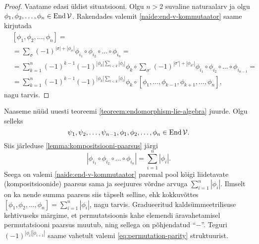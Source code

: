 \begin{proof}
    Vaatame edasi üldist situatsiooni. Olgu $n > 2$ suvaline
    naturaalarv ja olgu $\phi_1, \phi_2, \dots, \phi_n \in \operatorname{End} \mathcal{V}$.
    Rakendades valemit \eqref{naide:end-v-kommutaator} saame kirjutada
    \begin{align*}
        &[\phi_1, \phi_2, \dots, \phi_n] = \\
        &= \sum_\sigma (-1)^{|\sigma| + |\phi_\sigma|} \phi_{i_1} \circ
            \phi_{i_2} \circ \ldots \circ \phi_{i_n} = \\
        &= \sum_{k=1}^{n} (-1)^{k-1} (-1)^{|\phi_k| \sum_{l<k} |\phi_l|}
            \phi_k \circ \sum_{\sigma'}
            (-1)^{|\sigma'| + |\phi_{\sigma'}|}\phi_{i_1} \circ
            \phi_{i_2} \circ \ldots \circ \phi_{i_{n-1}} = \\
        &= \sum_{k=1}^{n} (-1)^{k-1} (-1)^{|\phi_k| \sum_{l<k} |\phi_l|}
            \phi_k \circ [
                \phi_1, \dots, \phi_{k-1}, \phi_{k+1}, \dots, \phi_n
            ],
    \end{align*}
    nagu tarvis.
\end{proof}

Naaseme nüüd uuesti teoreemi \ref{teoreem:endomorphism-lie-algebra} juurde.
Olgu selleks
\[
    \psi_1, \psi_2, \dots, \psi_{n-1},
    \phi_1, \phi_2, \dots, \phi_n \in \operatorname{End} \mathcal{V}.
\]
Siis järleduse \ref{lemma:kompositsiooni-paarsus} järgi
\[
    | \phi_{i_1} \circ \phi_{i_2} \circ \dots \circ \phi_{i_n} | =
    \sum_{i=1}^{n} |\phi_i|.
\]
Seega on valemi \eqref{naide:end-v-kommutaator} paremal pool kõigi
liidetavate (kompositsioonide) paarsus sama ja seejuures võrdne arvuga
$\sum_{i=1}^{n} |\phi_i|$. Ilmselt on ka nende summa paarsus siis
täpselt selline, ehk kokkuvõttes
$ [\phi_1, \phi_2, \dots, \phi_n] = \sum_{i=1}^{n} |\phi_i| $,
nagu tarvis. Gradueeritud kaldsümmeetrilisuse kehtivuseks
märgime, et permutatsioonis kahe elemendi äravahetamisel
permutatsiooni paarsus muutub, ning sellega on põhjendatud
"`$-$"'. Teguri $(-1)^{|\phi_i||\phi_{i+1}|}$ saame vahetult
valemi \eqref{eq:permutation-parity} struktuurist.


